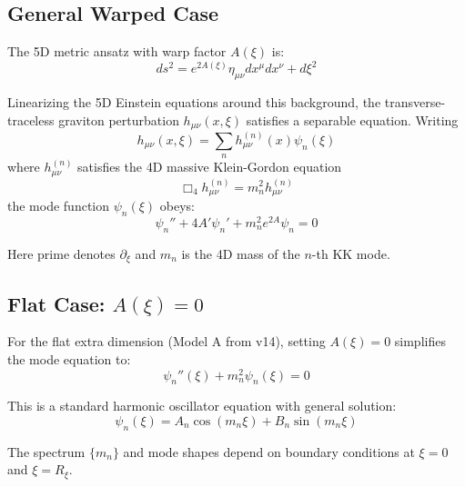 \documentclass[11pt,a4paper]{article}
\newcommand{\Rxi}{R_\xi}
\begin{document}
\subsection{General Warped Case}

The 5D metric ansatz with warp factor $A(\xi)$ is:
\begin{equation}
ds^2 = e^{2A(\xi)} \eta_{\mu\nu} dx^\mu dx^\nu + d\xi^2
\label{eq:5D-metric}
\end{equation}

Linearizing the 5D Einstein equations around this background, the transverse-traceless
graviton perturbation $h_{\mu\nu}(x,\xi)$ satisfies a separable equation. Writing
\begin{equation}
h_{\mu\nu}(x,\xi) = \sum_n h_{\mu\nu}^{(n)}(x) \psi_n(\xi)
\label{eq:KK-decomposition}
\end{equation}
where $h_{\mu\nu}^{(n)}$ satisfies the 4D massive Klein-Gordon equation
\begin{equation}
\Box_4 h_{\mu\nu}^{(n)} = m_n^2 h_{\mu\nu}^{(n)}
\label{eq:4D-KG}
\end{equation}
the mode function $\psi_n(\xi)$ obeys:
\begin{equation}
\psi_n'' + 4A' \psi_n' + m_n^2 e^{2A} \psi_n = 0
\label{eq:mode-equation-general}
\end{equation}

Here prime denotes $\partial_\xi$ and $m_n$ is the 4D mass of the $n$-th KK mode.

\subsection{Flat Case: $A(\xi) = 0$}

For the flat extra dimension (Model A from v14), setting $A(\xi) = 0$ simplifies
the mode equation to:
\begin{equation}
\psi_n''(\xi) + m_n^2 \psi_n(\xi) = 0
\label{eq:mode-equation-flat}
\end{equation}

This is a standard harmonic oscillator equation with general solution:
\begin{equation}
\psi_n(\xi) = A_n \cos(m_n \xi) + B_n \sin(m_n \xi)
\label{eq:general-solution}
\end{equation}

The spectrum $\{m_n\}$ and mode shapes depend on boundary conditions at $\xi = 0$
and $\xi = \Rxi$.

\end{document}
